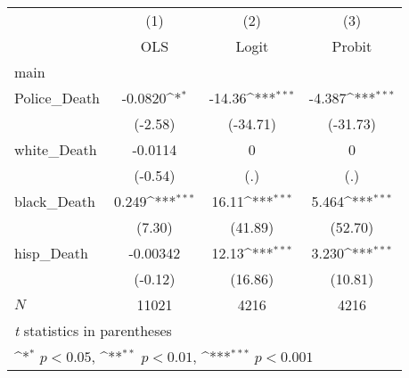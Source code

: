 {
\def\sym#1{\ifmmode^{#1}\else\(^{#1}\)\fi}
\begin{tabular}{l*{3}{c}}
\hline\hline
            &\multicolumn{1}{c}{(1)}&\multicolumn{1}{c}{(2)}&\multicolumn{1}{c}{(3)}\\
            &\multicolumn{1}{c}{OLS}&\multicolumn{1}{c}{Logit}&\multicolumn{1}{c}{Probit}\\
\hline
main        &                     &                     &                     \\
Police\_Death&     -0.0820\sym{*}  &      -14.36\sym{***}&      -4.387\sym{***}\\
            &     (-2.58)         &    (-34.71)         &    (-31.73)         \\
[1em]
white\_Death &     -0.0114         &           0         &           0         \\
            &     (-0.54)         &         (.)         &         (.)         \\
[1em]
black\_Death &       0.249\sym{***}&       16.11\sym{***}&       5.464\sym{***}\\
            &      (7.30)         &     (41.89)         &     (52.70)         \\
[1em]
hisp\_Death  &    -0.00342         &       12.13\sym{***}&       3.230\sym{***}\\
            &     (-0.12)         &     (16.86)         &     (10.81)         \\
\hline
\(N\)       &       11021         &        4216         &        4216         \\
\hline\hline
\multicolumn{4}{l}{\footnotesize \textit{t} statistics in parentheses}\\
\multicolumn{4}{l}{\footnotesize \sym{*} \(p<0.05\), \sym{**} \(p<0.01\), \sym{***} \(p<0.001\)}\\
\end{tabular}
}

